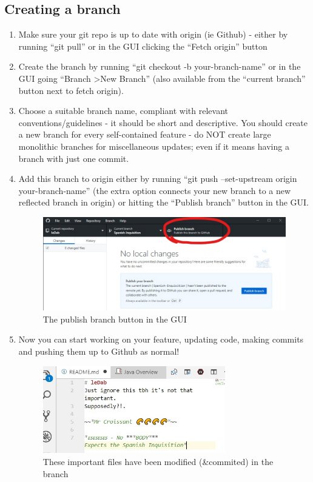 \documentclass[11pt, titlepage]{article}
\begin{document}
\subsection{Creating a branch}
\label{sec:BPRW_creating_branch}
\begin{enumerate}
	\item Make sure your git repo is up to date with origin (ie Github) - either by running ``git pull'' or in the GUI clicking the ``Fetch origin'' button
	\item Create the branch by running ``git checkout -b your-branch-name'' or in the GUI going ``Branch \textgreater New Branch'' (also available from the ``current branch'' button next to fetch origin).
	\item Choose a suitable branch name, compliant with relevant conventions/guidelines - it should be short and descriptive. You should create a new branch for every self-contained feature - do NOT create large monolithic branches for miscellaneous updates; even if it means having a branch with just one commit.
	\item Add this branch to origin either by running ``git push --set-upstream origin your-branch-name'' (the extra option connects your new branch to a new reflected branch in origin) or hitting the ``Publish branch'' button in the GUI.
	\begin{figure}[H]
		\centering
		\includegraphics[width=\textwidth]{BPRW/1publish-branch}
		\caption{The publish branch button in the GUI}
	\end{figure}
	\item Now you can start working on your feature, updating code, making commits and pushing them up to Github as normal!
	\begin{figure}[H]
		\centering
		\includegraphics[width=0.75\textwidth]{BPRW/2modified-file}
		\caption{These important files have been modified (\&commited) in the branch}
	\end{figure}
\end{enumerate}
\end{document}
